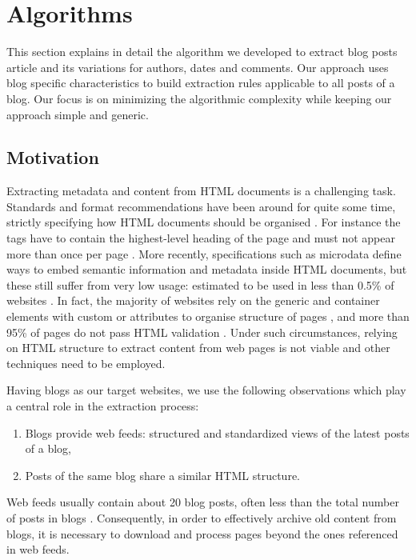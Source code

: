 \section{Algorithms}
\label{algorithms}

This section explains in detail the algorithm we developed to extract blog posts article and its variations for authors, dates and comments. Our approach uses blog specific characteristics to build extraction rules applicable to all posts of a blog. Our focus is on minimizing the algorithmic complexity while keeping our approach simple and generic.


\subsection{Motivation}
\label{motivation}

Extracting metadata and content from HTML documents is a challenging task. Standards and format recommendations have been around for quite some time, strictly specifying how HTML documents should be organised \cite{w3c2013}. For instance the  tags have to contain the highest-level heading of the page and must not appear more than once per page \cite{w3c2002}. More recently, specifications such as microdata \cite{whatwg2013} define ways to embed semantic information and metadata inside HTML documents, but these still suffer from very low usage: estimated to be used in less than 0.5\% of websites \cite{andrewrogers2013}. In fact, the majority of websites rely on the generic  and  container elements with custom  or  attributes to organise structure of pages \cite{brianwilson2008}, and more than 95\% of pages do not pass HTML validation \cite{brianwilson2008-a}. Under such circumstances, relying on HTML structure to extract content from web pages is not viable and other techniques need to be employed.


Having blogs as our target websites, we use the following observations which play a central role in the extraction process:
\begin{enumerate}[label={(\arabic*)}]
  \item\label{havefeedAssum} Blogs provide web feeds: structured and standardized views of the latest posts of a blog,
  \item\label{similarhtmlAssum} Posts of the same blog share a similar HTML structure.
\end{enumerate}
Web feeds usually contain about 20 blog posts, often less than the total number of posts in blogs \cite{oita2010}. Consequently, in order to effectively archive old content from blogs, it is necessary to download and process pages beyond the ones referenced in web feeds.


